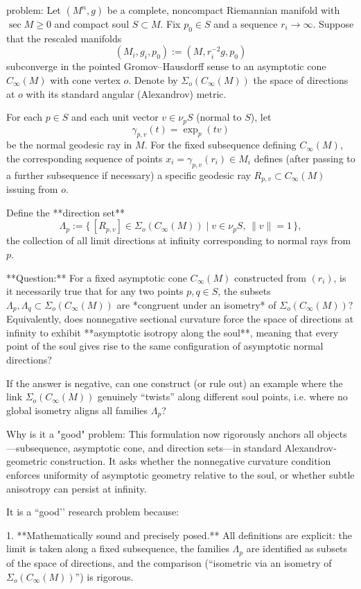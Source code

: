 problem:  
Let \( (M^n,g) \) be a complete, noncompact Riemannian manifold with \(\operatorname{sec} M \ge 0\) and compact soul \(S\subset M\).  
Fix \(p_0\in S\) and a sequence \(r_i\to\infty\). Suppose that the rescaled manifolds  
\[
(M_i,g_i,p_0):=(M,r_i^{-2}g,p_0)
\]
subconverge in the pointed Gromov–Hausdorff sense to an asymptotic cone \(C_\infty(M)\) with cone vertex \(o\).  
Denote by \(\Sigma_o(C_\infty(M))\) the space of directions at \(o\) with its standard angular (Alexandrov) metric.

For each \(p\in S\) and each unit vector \(v\in \nu_p S\) (normal to \(S\)), let  
\[
\gamma_{p,v}(t) = \exp_p(tv)
\]
be the normal geodesic ray in \(M\).  
For the fixed subsequence defining \(C_\infty(M)\), the corresponding sequence of points \(x_i = \gamma_{p,v}(r_i)\in M_i\) defines (after passing to a further subsequence if necessary) a specific geodesic ray \(R_{p,v}\subset C_\infty(M)\) issuing from \(o\).  

Define the **direction set**
\[
\Lambda_p := \{\, [R_{p,v}] \in \Sigma_o(C_\infty(M)) \mid v\in\nu_p S,\, \|v\|=1 \,\},
\]
the collection of all limit directions at infinity corresponding to normal rays from \(p\).

**Question:**  
For a fixed asymptotic cone \(C_\infty(M)\) constructed from \((r_i)\), is it necessarily true that for any two points \(p,q\in S\), the subsets \(\Lambda_p,\Lambda_q\subset \Sigma_o(C_\infty(M))\) are *congruent under an isometry* of \(\Sigma_o(C_\infty(M))\)?  
Equivalently, does nonnegative sectional curvature force the space of directions at infinity to exhibit **asymptotic isotropy along the soul**, meaning that every point of the soul gives rise to the same configuration of asymptotic normal directions?  

If the answer is negative, can one construct (or rule out) an example where the link \(\Sigma_o(C_\infty(M))\) genuinely “twists” along different soul points, i.e. where no global isometry aligns all families \(\Lambda_p\)?  

Why is it a "good" problem:  
This formulation now rigorously anchors all objects—subsequence, asymptotic cone, and direction sets—in standard Alexandrov‐geometric construction. It asks whether the nonnegative curvature condition enforces uniformity of asymptotic geometry relative to the soul, or whether subtle anisotropy can persist at infinity.

It is a “good’’ research problem because:

1. **Mathematically sound and precisely posed.**  
   All definitions are explicit: the limit is taken along a fixed subsequence, the families \(\Lambda_p\) are identified as subsets of the space of directions, and the comparison (“isometric via an isometry of \(\Sigma_o(C_\infty(M))\)”) is rigorous.

